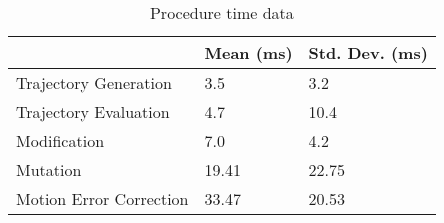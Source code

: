 \documentclass[12pt]{article}
\begin{document}
\begin{table}[]
\centering
\caption{Procedure time data}
\label{my-label}
\begin{tabular}{|l|l|l|}
\hline
                        & Mean (ms) & Std. Dev. (ms) \\ \hline
Trajectory Generation   & 3.5       & 3.2            \\ \hline
Trajectory Evaluation   & 4.7       & 10.4           \\ \hline
Modification            & 7.0       & 4.2            \\ \hline
Mutation                & 19.41     & 22.75          \\ \hline
Motion Error Correction & 33.47     & 20.53          \\ \hline
\end{tabular}
\end{table}
\end{document}
